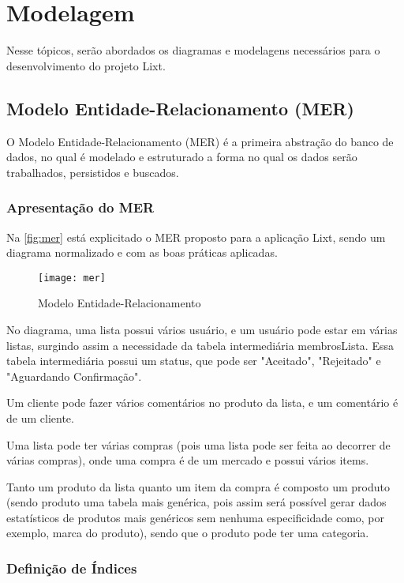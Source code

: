 \section{Modelagem}

Nesse tópicos, serão abordados os diagramas e modelagens necessários para o desenvolvimento do projeto Lixt.

\subsection{Modelo Entidade-Relacionamento (MER)}

O Modelo Entidade-Relacionamento (MER) é a primeira abstração do banco de dados, no qual é modelado e estruturado a forma no qual os dados serão trabalhados, persistidos e buscados.

\subsubsection{Apresentação do MER}

Na \autoref{fig:mer} está explicitado o MER proposto para a aplicação Lixt, sendo um diagrama normalizado e com as boas práticas aplicadas.

\begin{figure}[H]
  \centering
  \caption{Modelo Entidade-Relacionamento}
  \label{fig:mer}
  \texttt{[image: mer]}
\end{figure}

No diagrama, uma lista possui vários usuário, e um usuário pode estar em várias listas, surgindo assim a necessidade da tabela intermediária membrosLista. Essa tabela intermediária possui um status, que pode ser "Aceitado", "Rejeitado" e "Aguardando Confirmação".

Um cliente pode fazer vários comentários no produto da lista, 
e um comentário é de um cliente.

Uma lista pode ter várias compras (pois uma lista pode ser feita ao decorrer de várias compras), onde uma compra é de um mercado e possui vários items.

Tanto um produto da lista quanto um item da compra é 
composto um produto (sendo produto uma tabela mais genérica, pois assim será possível gerar dados estatísticos de produtos mais genéricos sem nenhuma especificidade como, por exemplo, marca do produto), sendo que o produto pode ter uma categoria.

\subsubsection{Definição de Índices}

